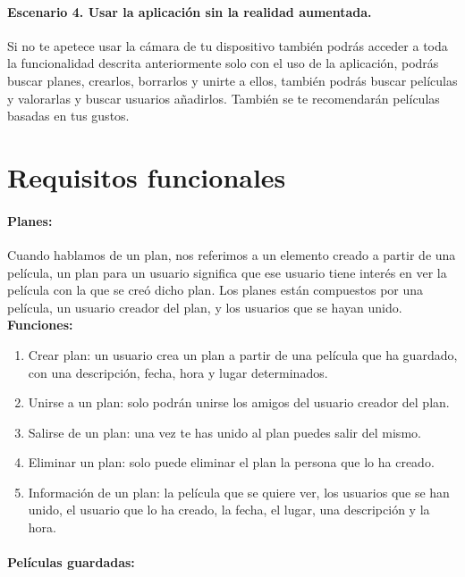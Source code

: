 \paragraph{Escenario 4. Usar la aplicación sin la realidad aumentada.}
\begin{flushleft}
     Si no te apetece usar la cámara de tu dispositivo también podrás acceder a toda la funcionalidad descrita anteriormente solo con el uso de la aplicación, podrás buscar planes, crearlos, borrarlos y unirte a ellos, también podrás buscar películas y valorarlas y buscar usuarios añadirlos. También se te 
     recomendarán películas basadas en tus gustos.
\end{flushleft}

\section{Requisitos funcionales}
\label{makereference3.3}

\paragraph{\large Planes:\\}

Cuando hablamos de un plan, nos referimos a un elemento creado a partir de una película, un plan para un usuario significa que ese usuario tiene interés en ver la película con la que se creó dicho plan.
Los planes están compuestos por una película, un usuario creador del plan, y los usuarios que se hayan unido.
\\
\textbf{Funciones:}
\begin{enumerate}
    \item Crear plan: un usuario crea un plan a partir de una película que ha guardado, con una descripción, fecha, hora y lugar determinados.
    \item Unirse a un plan: solo podrán unirse los amigos del usuario creador del plan.
    \item Salirse de un plan: una vez te has unido al plan puedes salir del mismo.
    \item Eliminar un plan: solo puede eliminar el plan la persona que lo ha creado.
    \item Información de un plan: la película que se quiere ver, los usuarios que se han unido, el usuario que lo ha creado, la fecha, el lugar, una descripción y la hora.
\end{enumerate} 
\paragraph{\large Películas guardadas:\\}


